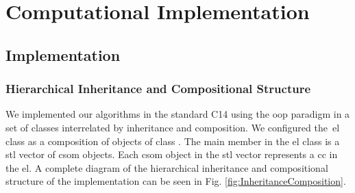 \documentclass[11pt,a4paper]{article}
\newcommand{\CC}{C\nolinebreak\hspace{-.05em}\raisebox{.4ex}{\tiny\bf +}\nolinebreak\hspace{-.10em}\raisebox{.4ex}{\tiny\bf +}}
\begin{document}












\section{Computational Implementation}

\subsection{ Implementation}

\subsubsection{ Hierarchical Inheritance and Compositional Structure}

We implemented our algorithms in the standard \CC14 using the \gls{oop} paradigm in a set of classes interrelated by inheritance and composition. We configured the~\gls{el} class as a composition of objects of class . The main member in the \gls{el} class is a \gls{stl} vector of \gls{csom} objects. Each \gls{csom} object in the \gls{stl} vector represents a \gls{cc} in the \gls{el}. A complete diagram of the hierarchical inheritance and compositional structure of the implementation can be seen in Fig. \ref{fig:InheritanceComposition}.
\end{document}
